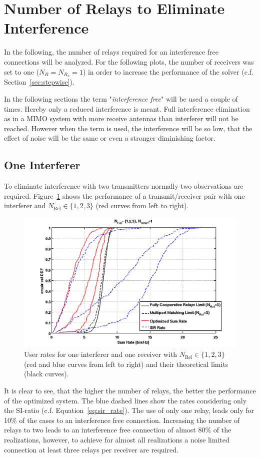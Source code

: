\section{Number of Relays to Eliminate Interference}
\label{sec:interf_fix}
In the following, the number of relays required for an interference free connections will be analyzed.
For the following plots, the number of receivers was set to one ($N_{R} = N_{R_x} = 1$) in order to increase the performance of the solver (c.f. Section~\ref{sec:stepwise}).

In the following sections the term "\textit{interference free}" will be used a couple of times.
Hereby only a reduced interference is meant.
Full interference elimination as in a MIMO system with more receive antennas than interferer will not be reached.
However when the term is used, the interference will be so low, that the effect of noise will be the same or even a stronger diminishing factor.

\subsection{One Interferer}
\label{sec:1interf}
To eliminate interference with two transmitters normally two observations are required.
Figure~\ref{fig:relcomp_1} shows the performance of a transmit/receiver pair with one interferer and $N_\text{Rel}\in\{1,2,3\}$ (red curves from left to right).
\begin{figure}[h]
\centering
  \includegraphics[width=0.9\linewidth]{images/Relcomparison_1interferer.png}
\caption{User rates for one interferer and one receiver with  $N_\text{Rel}\in\{1,2,3\}$ (red and blue curves from left to right) and their theoretical limits (black curves).}
\label{fig:relcomp_1}
\end{figure}
It is clear to see, that the higher the number of relays, the better the performance of the optimized system.
The blue dashed lines show the rates considering only the SI-ratio (c.f. Equation~\eqref{eq:sir_rate}).
The use of only one relay, leads only for 10\% of the cases to an interference free connection.
Increasing the number of relays to two leads to an interference free connection of almost 80\% of the realizations, however, to achieve for almost all realizations a noise limited connection at least three relays per receiver are required.

